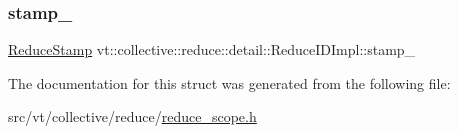 \subsubsection{\texorpdfstring{stamp\+\_\+}{stamp\_}}
{\footnotesize\ttfamily \hyperlink{namespacevt_1_1collective_1_1reduce_1_1detail_aacc1fcd729d934ba143fee3a943bf9e7}{Reduce\+Stamp} vt\+::collective\+::reduce\+::detail\+::\+Reduce\+I\+D\+Impl\+::stamp\+\_\+\hspace{0.3cm}{\ttfamily [protected]}}



The documentation for this struct was generated from the following file\+:\begin{DoxyCompactItemize}
\item 
src/vt/collective/reduce/\hyperlink{reduce__scope_8h}{reduce\+\_\+scope.\+h}\end{DoxyCompactItemize}
